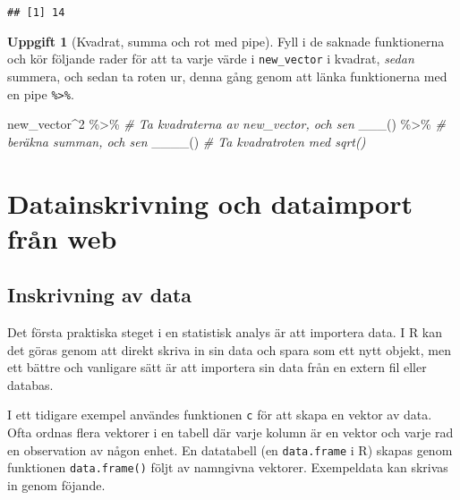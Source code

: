 \documentclass[
]{book}
\newenvironment{Shaded}{\begin{snugshade}}{\end{snugshade}}
\newcommand{\CommentTok}[1]{\textcolor[rgb]{0.56,0.35,0.01}{\textit{#1}}}
\newcommand{\DecValTok}[1]{\textcolor[rgb]{0.00,0.00,0.81}{#1}}
\newcommand{\FunctionTok}[1]{\textcolor[rgb]{0.00,0.00,0.00}{#1}}
\newcommand{\NormalTok}[1]{#1}
\newcommand{\SpecialCharTok}[1]{\textcolor[rgb]{0.00,0.00,0.00}{#1}}
\theoremstyle{definition}
\theoremstyle{definition}
\theoremstyle{definition}
\newtheorem{exercise}{Uppgift}[chapter]
\theoremstyle{definition}
\theoremstyle{remark}
\begin{document}
\begin{verbatim}
## [1] 14
\end{verbatim}

\begin{exercise}[Kvadrat, summa och rot med pipe]

Fyll i de saknade funktionerna och kör följande rader för att ta varje värde i \texttt{new\_vector} i kvadrat, \emph{sedan} summera, och sedan ta roten ur, denna gång genom att länka funktionerna med en pipe \texttt{\%\textgreater{}\%}.

\begin{Shaded}
\begin{Highlighting}[]
\NormalTok{new\_vector}\SpecialCharTok{\^{}}\DecValTok{2} \SpecialCharTok{\%\textgreater{}\%}                       \CommentTok{\# Ta kvadraterna av new\_vector, och sen}
  \FunctionTok{\_\_\_}\NormalTok{() }\SpecialCharTok{\%\textgreater{}\%}                            \CommentTok{\# beräkna summan, och sen}
  \FunctionTok{\_\_\_\_}\NormalTok{()                               }\CommentTok{\# Ta kvadratroten med sqrt()}
\end{Highlighting}
\end{Shaded}

\end{exercise}

\hypertarget{datainskrivning-och-dataimport-fruxe5n-web}{%
\section{Datainskrivning och dataimport från web}\label{datainskrivning-och-dataimport-fruxe5n-web}}

\hypertarget{inskrivning-av-data}{%
\subsection{Inskrivning av data}\label{inskrivning-av-data}}

Det första praktiska steget i en statistisk analys är att importera data. I R kan det göras genom att direkt skriva in sin data och spara som ett nytt objekt, men ett bättre och vanligare sätt är att importera sin data från en extern fil eller databas.

I ett tidigare exempel användes funktionen \texttt{c} för att skapa en vektor av data. Ofta ordnas flera vektorer i en tabell där varje kolumn är en vektor och varje rad en observation av någon enhet. En datatabell (en \texttt{data.frame} i R) skapas genom funktionen \texttt{data.frame()} följt av namngivna vektorer. Exempeldata kan skrivas in genom föjande.
\end{document}
